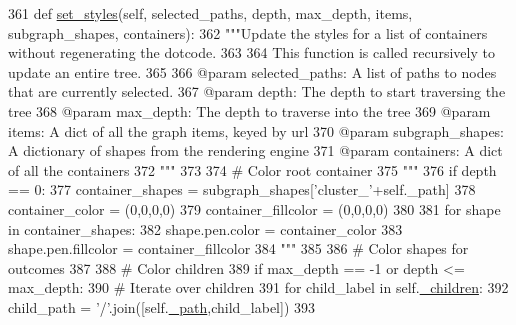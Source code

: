 \begin{DoxyCode}
361     \textcolor{keyword}{def }\hyperlink{classsmacc__viewer_1_1ContainerNode_ae35633b977b8ea568e70a62dcd3c4632}{set\_styles}(self, selected\_paths, depth, max\_depth, items, subgraph\_shapes, containers):
362         \textcolor{stringliteral}{"""Update the styles for a list of containers without regenerating the dotcode.}
363 \textcolor{stringliteral}{}
364 \textcolor{stringliteral}{        This function is called recursively to update an entire tree.}
365 \textcolor{stringliteral}{        }
366 \textcolor{stringliteral}{        @param selected\_paths: A list of paths to nodes that are currently selected.}
367 \textcolor{stringliteral}{        @param depth: The depth to start traversing the tree}
368 \textcolor{stringliteral}{        @param max\_depth: The depth to traverse into the tree}
369 \textcolor{stringliteral}{        @param items: A dict of all the graph items, keyed by url}
370 \textcolor{stringliteral}{        @param subgraph\_shapes: A dictionary of shapes from the rendering engine}
371 \textcolor{stringliteral}{        @param containers: A dict of all the containers}
372 \textcolor{stringliteral}{        """}
373 
374         \textcolor{comment}{# Color root container}
375         \textcolor{stringliteral}{"""}
376 \textcolor{stringliteral}{        if depth == 0:}
377 \textcolor{stringliteral}{            container\_shapes = subgraph\_shapes['cluster\_'+self.\_path]}
378 \textcolor{stringliteral}{            container\_color = (0,0,0,0)}
379 \textcolor{stringliteral}{            container\_fillcolor = (0,0,0,0)}
380 \textcolor{stringliteral}{}
381 \textcolor{stringliteral}{            for shape in container\_shapes:}
382 \textcolor{stringliteral}{                shape.pen.color = container\_color}
383 \textcolor{stringliteral}{                shape.pen.fillcolor = container\_fillcolor}
384 \textcolor{stringliteral}{                """}
385 
386         \textcolor{comment}{# Color shapes for outcomes}
387 
388         \textcolor{comment}{# Color children}
389         \textcolor{keywordflow}{if} max\_depth == -1 \textcolor{keywordflow}{or} depth <= max\_depth:
390             \textcolor{comment}{# Iterate over children}
391             \textcolor{keywordflow}{for} child\_label \textcolor{keywordflow}{in} self.\hyperlink{classsmacc__viewer_1_1ContainerNode_a886cb99815f827d99bcd4c3e341284f1}{\_children}:
392                 child\_path = \textcolor{stringliteral}{'/'}.join([self.\hyperlink{classsmacc__viewer_1_1ContainerNode_ae600e450e4ccfa137937076c391ded72}{\_path},child\_label])
393 

\end{DoxyCode}
